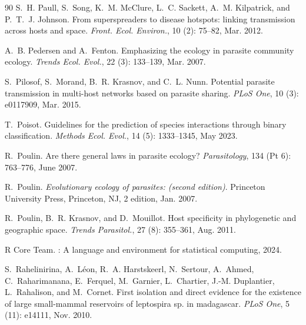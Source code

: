 \documentclass[oneside, a4paper, onecolumn, 11pt]{article}
\begin{document}
\begin{thebibliography}{90}
S.~H. Paull, S.~Song, K.~M. McClure, L.~C. Sackett, A.~M. Kilpatrick, and P.~T.~J. Johnson.
\newblock From superspreaders to disease hotspots: linking transmission across hosts and space.
\newblock \emph{Front. Ecol. Environ.}, 10 (2): 75--82, Mar. 2012.

A.~B. Pedersen and A.~Fenton.
\newblock Emphasizing the ecology in parasite community ecology.
\newblock \emph{Trends Ecol. Evol.}, 22 (3): 133--139, Mar. 2007.

S.~Pilosof, S.~Morand, B.~R. Krasnov, and C.~L. Nunn.
\newblock Potential parasite transmission in multi-host networks based on parasite sharing.
\newblock \emph{PLoS One}, 10 (3): e0117909, Mar. 2015.

T.~Poisot.
\newblock Guidelines for the prediction of species interactions through binary classification.
\newblock \emph{Methods Ecol. Evol.}, 14 (5): 1333--1345, May 2023.

R.~Poulin.
\newblock Are there general laws in parasite ecology?
\newblock \emph{Parasitology}, 134 (Pt 6): 763--776, June 2007{}.

R.~Poulin.
\newblock \emph{Evolutionary ecology of parasites: (second edition)}.
\newblock Princeton University Press, Princeton, NJ, 2 edition, Jan. 2007{}.

R.~Poulin, B.~R. Krasnov, and D.~Mouillot.
\newblock Host specificity in phylogenetic and geographic space.
\newblock \emph{Trends Parasitol.}, 27 (8): 355--361, Aug. 2011.

{R Core Team}.
: A language and environment for statistical computing, 2024.

S.~Rahelinirina, A.~Léon, R.~A. Harstskeerl, N.~Sertour, A.~Ahmed, C.~Raharimanana, E.~Ferquel, M.~Garnier, L.~Chartier, J.-M. Duplantier, L.~Rahalison, and M.~Cornet.
\newblock First isolation and direct evidence for the existence of large small-mammal reservoirs of leptospira sp. in madagascar.
\newblock \emph{PLoS One}, 5 (11): e14111, Nov. 2010.


\end{thebibliography}
\end{document}
